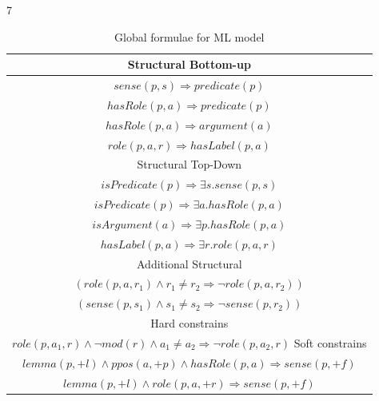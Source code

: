 \begin{table}
    7\centering
    \begin{tabular}{|c|}\hline
        Structural Bottom-up\\\hline\hline
        $sense(p,s) \Rightarrow predicate(p)$\\
        $hasRole(p,a) \Rightarrow predicate(p)$\\
        $hasRole(p,a) \Rightarrow argument(a)$\\
        $role(p,a,r) \Rightarrow hasLabel(p,a)$\\
        Structural Top-Down\\\hline\hline
        $isPredicate(p) \Rightarrow\exists s.sense(p,s)$\\
        $isPredicate(p) \Rightarrow\exists a.hasRole(p,a)$\\
        $isArgument(a)  \Rightarrow\exists p.hasRole(p,a)$\\
        $hasLabel(p,a) \Rightarrow\exists r. role(p,a,r)$\\
        Additional Structural\\\hline\hline
        $(role(p,a,r_1) \wedge r_1 \neq r_2 \Rightarrow \neg role(p,a,r_2) )$\\
        $(sense(p,s_1) \wedge s_1 \neq s_2 \Rightarrow \neg sense(p,r_2) )$\\
        Hard constrains\\\hline\hline
        $role\left(p,a_{1},r\right)\wedge \neg mod\left(r\right)\wedge a_{1}\neq a_{2}  \Rightarrow \neg role\left(p,a_{2},r\right) $
        Soft constrains\\\hline\hline
        $ lemma(p,+l) \wedge ppos(a,+p) \wedge hasRole(p,a)  \Rightarrow sense(p,+f) $ \\
        $ lemma(p,+l) \wedge role(p,a,+r) \Rightarrow sense(p,+f) $ \\
        \hline
    \end{tabular}
    \caption{Global formulae for ML model}
    \label{tbl:global}
\end{table}

